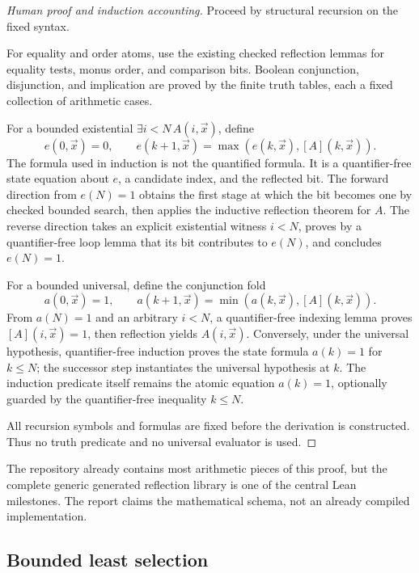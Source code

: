 \begin{proof}[Human proof and induction accounting]
Proceed by structural recursion on the fixed syntax.

For equality and order atoms, use the existing checked reflection lemmas for
equality tests, monus order, and comparison bits.  Boolean conjunction,
disjunction, and implication are proved by the finite truth tables, each a
fixed collection of arithmetic cases.

For a bounded existential \(\exists i<N\,A(i,\vec x)\), define
\[
 e(0,\vec x)=0,\qquad
 e(k+1,\vec x)=\max(e(k,\vec x),[A](k,\vec x)).
\]
The formula used in induction is not the quantified formula.  It is a
quantifier-free state equation about \(e\), a candidate index, and the
reflected bit.  The forward direction from \(e(N)=1\) obtains the first stage
at which the bit becomes one by checked bounded search, then applies the
inductive reflection theorem for \(A\).  The reverse direction takes an
explicit existential witness \(i<N\), proves by a quantifier-free loop lemma
that its bit contributes to \(e(N)\), and concludes \(e(N)=1\).

For a bounded universal, define the conjunction fold
\[
 a(0,\vec x)=1,\qquad
 a(k+1,\vec x)=\min(a(k,\vec x),[A](k,\vec x)).
\]
From \(a(N)=1\) and an arbitrary \(i<N\), a quantifier-free indexing lemma
proves \([A](i,\vec x)=1\), then reflection yields \(A(i,\vec x)\).  Conversely,
under the universal hypothesis, quantifier-free induction proves the state
formula \(a(k)=1\) for \(k\le N\); the successor step instantiates the
universal hypothesis at \(k\).  The induction predicate itself remains the
atomic equation \(a(k)=1\), optionally guarded by the quantifier-free
inequality \(k\le N\).

All recursion symbols and formulas are fixed before the derivation is
constructed.  Thus no truth predicate and no universal evaluator is used.
\end{proof}

\begin{remark}
The repository already contains most arithmetic pieces of this proof, but the
complete generic generated reflection library is one of the central Lean
milestones.  The report claims the mathematical schema, not an already
compiled implementation.
\end{remark}

\subsection{Bounded least selection}


